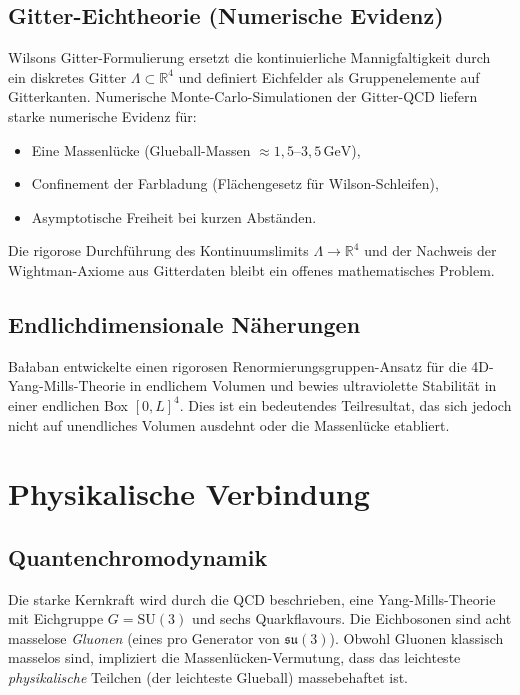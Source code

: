 \documentclass[12pt,a4paper]{amsart}
\theoremstyle{definition}
\theoremstyle{remark}
\begin{document}
\subsection{Gitter-Eichtheorie (Numerische Evidenz)}

Wilsons Gitter-Formulierung \cite{Wilson1974} ersetzt die kontinuierliche Mannigfaltigkeit
durch ein diskretes Gitter $\Lambda \subset \mathbb{R}^4$ und definiert Eichfelder als
Gruppenelemente auf Gitterkanten. Numerische Monte-Carlo-Simulationen der Gitter-QCD
liefern starke numerische Evidenz für:
\begin{itemize}[noitemsep]
  \item Eine Massenlücke (Glueball-Massen $\approx 1{,}5$--$3{,}5 \,\mathrm{GeV}$),
  \item Confinement der Farbladung (Flächengesetz für Wilson-Schleifen),
  \item Asymptotische Freiheit bei kurzen Abständen.
\end{itemize}
Die rigorose Durchführung des Kontinuumslimits $\Lambda \to \mathbb{R}^4$ und der Nachweis
der Wightman-Axiome aus Gitterdaten bleibt ein offenes mathematisches Problem.

\subsection{Endlichdimensionale Näherungen}

Bałaban \cite{Balaban1985} entwickelte einen rigorosen Renormierungsgruppen-Ansatz für
die 4D-Yang-Mills-Theorie in endlichem Volumen und bewies ultraviolette Stabilität in
einer endlichen Box $[0,L]^4$. Dies ist ein bedeutendes Teilresultat, das sich jedoch
nicht auf unendliches Volumen ausdehnt oder die Massenlücke etabliert.

\section{Physikalische Verbindung}
\label{sec:physik}

\subsection{Quantenchromodynamik}

Die starke Kernkraft wird durch die QCD beschrieben, eine Yang-Mills-Theorie mit
Eichgruppe $G = \mathrm{SU}(3)$ und sechs Quarkflavours. Die Eichbosonen sind acht
masselose \emph{Gluonen} (eines pro Generator von $\mathfrak{su}(3)$). Obwohl Gluonen
klassisch masselos sind, impliziert die Massenlücken-Vermutung, dass das leichteste
\emph{physikalische} Teilchen (der leichteste Glueball) massebehaftet ist.
\end{document}
